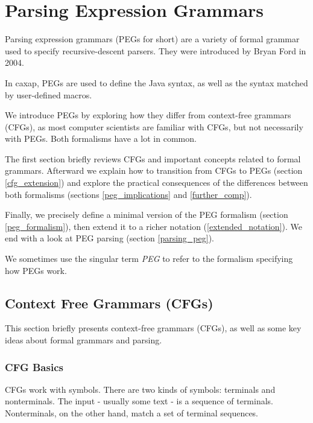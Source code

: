 \chapter{Parsing Expression Grammars}
\label{peg_intro}

Parsing expression grammars (PEGs for short) are a variety of formal grammar
used to specify recursive-descent parsers. They were introduced by Bryan Ford in
2004. \cite{ford2004}

In caxap, PEGs are used to define the Java syntax, as well as the syntax matched
by user-defined macros.

We introduce PEGs by exploring how they differ from context-free grammars
(CFGs), as most computer scientists are familiar with CFGs, but not necessarily
with PEGs. Both formalisms have a lot in common.

The first section briefly reviews CFGs and important concepts related to
formal grammars. Afterward we explain how to transition from CFGs to PEGs
(section \ref{cfg_extension}) and explore the practical consequences of the
differences between both formalisms (sections \ref{peg_implications} and
\ref{further_comp}).

Finally, we precisely define a minimal version of the PEG formalism (section
\ref{peg_formalism}), then extend it to a richer notation
(\ref{extended_notation}). We end with a look at PEG parsing (section
\ref{parsing_peg}).

We sometimes use the singular term \emph{PEG} to refer to the formalism
specifying how PEGs work.

\section{Context Free Grammars (CFGs)}
\label{cfgs}

This section briefly presents context-free grammars (CFGs), as well as some key
ideas about formal grammars and parsing.

\subsection{CFG Basics}
\label{cfg_basics}

CFGs work with symbols. There are two kinds of symbols: terminals and
nonterminals. The input - usually some text - is a sequence of terminals.
Nonterminals, on the other hand, match a set of terminal sequences.

